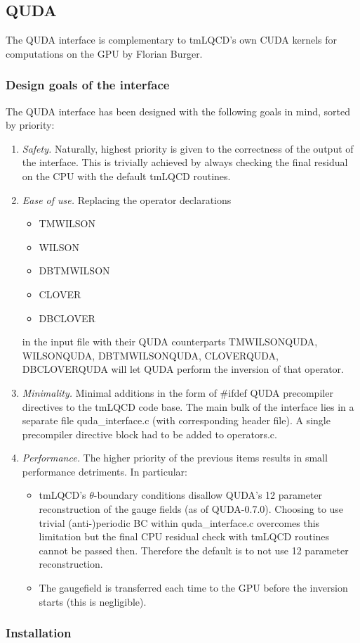 \subsection{QUDA}


The QUDA interface is complementary to tmLQCD's own CUDA kernels for computations on the GPU by Florian Burger.

\subsubsection{Design goals of the interface}
The QUDA interface has been designed with the following goals in mind, sorted by priority:
\begin{enumerate}
	\item \emph{Safety.} Naturally, highest priority is given to the correctness of the output of the interface. 
	This is trivially achieved by always checking the final residual on the CPU with the default tmLQCD routines.
	\item \emph{Ease of use.} Replacing the operator declarations
	\begin{itemize}
		\item {\ttfamily TMWILSON}
		\item {\ttfamily WILSON}
		\item {\ttfamily DBTMWILSON}
		\item {\ttfamily CLOVER}
		\item {\ttfamily DBCLOVER}
	\end{itemize}
	in the input file with their QUDA counterparts {\ttfamily TMWILSONQUDA, WILSONQUDA, DBTMWILSONQUDA, CLOVERQUDA, DBCLOVERQUDA} will let QUDA perform the inversion of that operator.
	\item \emph{Minimality.} Minimal additions in the form of {\ttfamily \#ifdef QUDA} precompiler directives to the tmLQCD code base. The main bulk of the interface lies in a separate file {\ttfamily quda\_interface.c} (with corresponding header file). A single precompiler directive block had to be added to {\ttfamily operators.c}.
	\item \emph{Performance.} The higher priority of the previous items results in small performance detriments. In particular:
	\begin{itemize}
		\item tmLQCD's $\theta$-boundary conditions disallow QUDA's 12 parameter reconstruction of the gauge fields (as of QUDA-0.7.0). Choosing to use trivial (anti-)periodic BC within {\ttfamily quda\_interface.c} overcomes this limitation but the final CPU residual check with tmLQCD routines cannot be passed then. Therefore the default is to not use 12 parameter reconstruction.
		\item The gaugefield is transferred each time to the GPU before the inversion starts (this is negligible).
	\end{itemize}
\end{enumerate}


\subsubsection{Installation}


